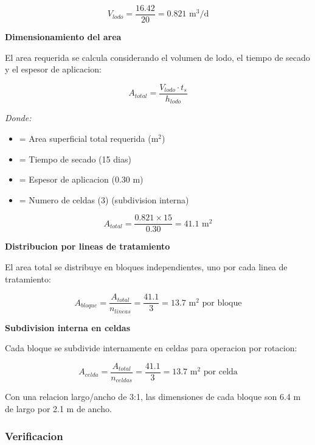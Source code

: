 \documentclass[12pt,a4paper]{article}
\begin{document}
\begin{equation}
V_{lodo} = \frac{16.42}{20} = 0.821 \text{ m}^3\text{/d}
\end{equation}

\textbf{Dimensionamiento del area}

El area requerida se calcula considerando el volumen de lodo, el tiempo de secado y el espesor de aplicacion:

\begin{equation}
A_{total} = \frac{V_{lodo} \cdot t_s}{h_{lodo}}
\end{equation}

\textit{Donde:}
\begin{itemize}[noitemsep,leftmargin=2em]
    \item[$A_{total}$] = Area superficial total requerida (m$^2$)
    \item[$t_s$] = Tiempo de secado (15 dias)
    \item[$h_{lodo}$] = Espesor de aplicacion (0.30 m)
    \item[$n_{celdas}$] = Numero de celdas (3) (subdivision interna)
\end{itemize}

\begin{equation}
A_{total} = \frac{0.821 \times 15}{0.30} = 41.1 \text{ m}^2
\end{equation}

\textbf{Distribucion por lineas de tratamiento}

El area total se distribuye en bloques independientes, uno por cada linea de tratamiento:

\begin{equation}
A_{bloque} = \frac{A_{total}}{n_{lineas}} = \frac{41.1}{3} = 13.7 \text{ m}^2 \text{ por bloque}
\end{equation}

\textbf{Subdivision interna en celdas}

Cada bloque se subdivide internamente en celdas para operacion por rotacion:

\begin{equation}
A_{celda} = \frac{A_{total}}{n_{celdas}} = \frac{41.1}{3} = 13.7 \text{ m}^2 \text{ por celda}
\end{equation}

Con una relacion largo/ancho de 3:1, las dimensiones de cada bloque son 6.4 m de largo por 2.1 m de ancho.

\subsubsection{Verificacion}
\end{document}
